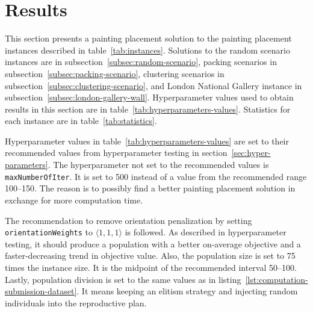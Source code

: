 \clearpage
\newpage


\section{Results}\label{sec:results}
This section presents a painting placement solution to the painting placement instances described in table~\ref{tab:instances}.
Solutions to the random scenario instances are in subsection~\ref{subsec:random-scenario},
packing scenarios in subsection~\ref{subsec:packing-scenario}, clustering scenarios in subsection~\ref{subsec:clustering-scenario},
and London National Gallery instance in subsection~\ref{subsec:london-gallery-wall}.
Hyperparameter values used to obtain results in this section are in table~\ref{tab:hyperparameters-values}.
Statistics for each instance are in table~\ref{tab:statistics}.

Hyperparameter values in table~\ref{tab:hyperparameters-values} are set to their recommended values
from hyperparameter testing in section~\ref{sec:hyper-parameters}.
The hyperparameter not set to the recommended values is \verb|maxNumberOfIter|.
It is set to 500 instead of a value from the recommended range \numrange{100}{150}.
The reason is to possibly find a better painting placement solution in exchange for more computation time.

The recommendation to remove orientation penalization by setting \verb|orientationWeights| to $\langle 1,1,1\rangle$ is followed.
As described in hyperparameter testing, it should produce a population with a better on-average objective and a faster-decreasing trend in objective value.
Also, the population size is set to 75 times the instance size.
It is the midpoint of the recommended interval \numrange{50}{100}.
Lastly, population division is set to the same values as in listing~\ref{lst:computation-submission-dataset}.
It means keeping an elitism strategy and injecting random individuals into the reproductive plan.


